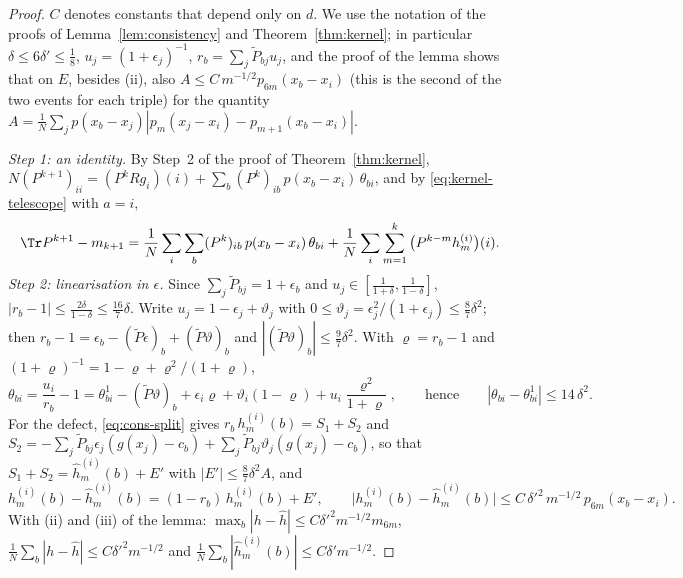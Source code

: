 \begin{proof}
$C$ denotes constants that depend only on $d$. We use the notation of the proofs of Lemma~\ref{lem:consistency} and Theorem~\ref{thm:kernel}; in particular $\delta\le6\delta'\le\frac18$, $u_j=(1+\epsilon_j)^{-1}$, $r_b=\sum_j\tilde P_{bj}u_j$, and the proof of the lemma shows that on $E$, besides (ii), also $A\le C\,m^{-1/2}p_{6m}(x_b-x_i)$ (this is the second of the two events for each triple) for the quantity $A=\frac1N\sum_jp(x_b-x_j)|p_m(x_j-x_i)-p_{m+1}(x_b-x_i)|$.

\emph{Step 1: an identity.} By Step~2 of the proof of Theorem~\ref{thm:kernel}, $N(P^{k+1})_{ii}=(P^kRg_i)(i)+\sum_b(P^k)_{ib}\,p(x_b-x_i)\,\theta_{bi}$, and by \eqref{eq:kernel-telescope} with $a=i$,
\[
\Tr P^{k+1}-m_{k+1}=\frac1N\sum_i\sum_b(P^k)_{ib}\,p(x_b-x_i)\,\theta_{bi}+\frac1N\sum_i\sum_{m=1}^k\big(P^{k-m}h^{(i)}_m\big)(i).
\]
\emph{Step 2: linearisation in $\epsilon$.} Since $\sum_j\tilde P_{bj}=1+\epsilon_b$ and $u_j\in[\frac1{1+\delta},\frac1{1-\delta}]$, $|r_b-1|\le\frac{2\delta}{1-\delta}\le\frac{16}7\delta$. Write $u_j=1-\epsilon_j+\vartheta_j$ with $0\le\vartheta_j=\epsilon_j^2/(1+\epsilon_j)\le\frac87\delta^2$; then $r_b-1=\epsilon_b-(\tilde P\epsilon)_b+(\tilde P\vartheta)_b$ and $|(\tilde P\vartheta)_b|\le\frac97\delta^2$. With $\varrho=r_b-1$ and $(1+\varrho)^{-1}=1-\varrho+\varrho^2/(1+\varrho)$,
\[
\theta_{bi}=\frac{u_i}{r_b}-1=\theta^1_{bi}-(\tilde P\vartheta)_b+\epsilon_i\varrho+\vartheta_i(1-\varrho)+u_i\frac{\varrho^2}{1+\varrho},\qquad\text{hence}\qquad|\theta_{bi}-\theta^1_{bi}|\le14\,\delta^2 .
\]
For the defect, \eqref{eq:cons-split} gives $r_b\,h^{(i)}_m(b)=S_1+S_2$ and $S_2=-\sum_j\tilde P_{bj}\epsilon_j(g(x_j)-c_b)+\sum_j\tilde P_{bj}\vartheta_j(g(x_j)-c_b)$, so that $S_1+S_2=\hat h^{(i)}_m(b)+E'$ with $|E'|\le\frac87\delta^2A$, and
\[
h^{(i)}_m(b)-\hat h^{(i)}_m(b)=(1-r_b)\,h^{(i)}_m(b)+E',\qquad\big|h^{(i)}_m(b)-\hat h^{(i)}_m(b)\big|\le C\,\delta'^2\,m^{-1/2}\,p_{6m}(x_b-x_i).
\]
With (ii) and (iii) of the lemma: $\max_b|h-\hat h|\le C\delta'^2m^{-1/2}m_{6m}$, $\frac1N\sum_b|h-\hat h|\le C\delta'^2m^{-1/2}$ and $\frac1N\sum_b|\hat h^{(i)}_m(b)|\le C\delta'm^{-1/2}$.


\end{proof}
